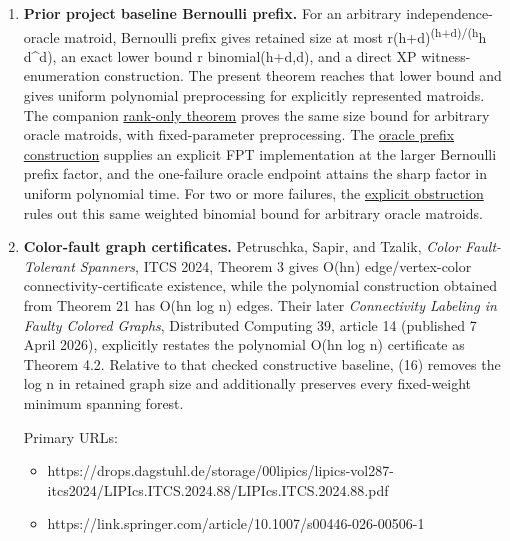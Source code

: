 \begin{enumerate}
\def\labelenumi{\arabic{enumi}.}
\item
  \textbf{Prior project baseline Bernoulli prefix.} For an arbitrary independence-oracle matroid, Bernoulli prefix gives retained size at most r(h+d)\textsuperscript{(h+d)/(h}h d\^{}d), an exact lower bound r binomial(h+d,d), and a direct XP witness-enumeration construction. The present theorem reaches that lower bound and gives uniform polynomial preprocessing for explicitly represented matroids. The companion \href{https://github.com/icekylinx/algorithm-frontier/blob/main/problems/matroid-failure-summaries/manuscripts/arbitrary-matroid-and-submodular-failure-summaries.md}{rank-only theorem} proves the same size bound for arbitrary oracle matroids, with fixed-parameter preprocessing. The \href{https://github.com/icekylinx/algorithm-frontier/blob/main/problems/matroid-failure-summaries/manuscripts/weighted-oracle-prefix-fpt-construction.md}{oracle prefix construction} supplies an explicit FPT implementation at the larger Bernoulli prefix factor, and the one-failure oracle endpoint attains the sharp factor in uniform polynomial time. For two or more failures, the \href{https://github.com/icekylinx/algorithm-frontier/blob/main/problems/matroid-failure-summaries/manuscripts/weighted-oracle-two-failure-obstruction.md}{explicit obstruction} rules out this same weighted binomial bound for arbitrary oracle matroids.
\item
  \textbf{Color-fault graph certificates.} Petruschka, Sapir, and Tzalik, \emph{Color Fault-Tolerant Spanners}, ITCS 2024, Theorem 3 gives O(hn) edge/vertex-color connectivity-certificate existence, while the polynomial construction obtained from Theorem 21 has O(hn log n) edges. Their later \emph{Connectivity Labeling in Faulty Colored Graphs}, Distributed Computing 39, article 14 (published 7 April 2026), explicitly restates the polynomial O(hn log n) certificate as Theorem 4.2. Relative to that checked constructive baseline, (16) removes the log n in retained graph size and additionally preserves every fixed-weight minimum spanning forest.

  Primary URLs:

  \begin{itemize}
  \tightlist
  \item
    https://drops.dagstuhl.de/storage/00lipics/lipics-vol287-itcs2024/LIPIcs.ITCS.2024.88/LIPIcs.ITCS.2024.88.pdf
  \item
    https://link.springer.com/article/10.1007/s00446-026-00506-1
  \end{itemize}


\end{enumerate}
